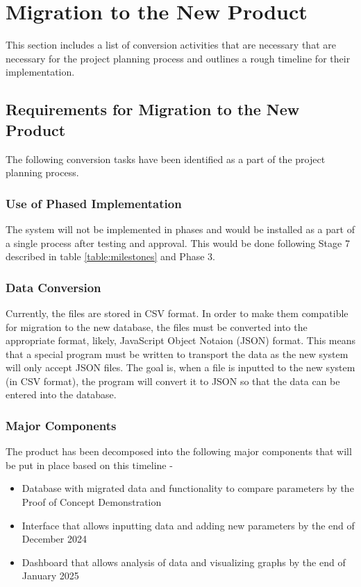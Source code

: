 \documentclass[12pt]{article}
\begin{document}
\section{Migration to the New Product}
This section includes a list of conversion activities that are necessary that are necessary for the project planning process and outlines a rough timeline for their implementation.
\subsection{Requirements for Migration to the New Product}
The following conversion tasks have been identified as a part of the project planning process.
\subsubsection{Use of Phased Implementation}
The system will not be implemented in phases and would be installed as a part of a single process after testing and approval. This would be done following Stage 7 described in table
\ref{table:milestones} and Phase 3.

\subsubsection{Data Conversion}
\label{data}
Currently, the files are stored in CSV format. In order to make them compatible for migration to the new database, the files must be converted into the appropriate format, likely, 
JavaScript Object Notaion (JSON) format. This means that a special program must be written to transport the data as the new system will only accept JSON files. 
The goal is, when a file is inputted to the new system (in CSV format), the program will convert it to JSON so that the data can be entered into the database.

\subsubsection{Major Components}
The product has been decomposed into the following major components that will be put in place based on this timeline - 
\begin{itemize}
  \item Database with migrated data and functionality to compare parameters by the Proof of Concept Demonstration
  \item Interface that allows inputting data and adding new parameters by the end of December 2024
  \item Dashboard that allows analysis of data and visualizing graphs by the end of January 2025
\end{itemize}
\end{document}
